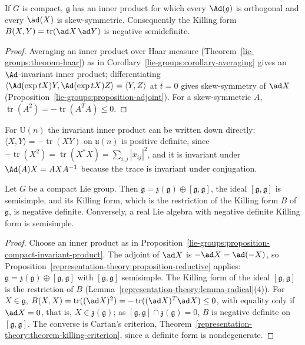 \begin{proposition}\label{lie-groups:proposition-compact-invariant-product}
If $G$ is compact, $\mathfrak{g}$ has an inner product for which every $\Ad(g)$ is orthogonal and every $\ad(X)$ is skew-symmetric. Consequently the Killing form $B(X, Y) = \operatorname{tr}(\ad X\,\ad Y)$ is negative semidefinite.
\end{proposition}

\begin{proof}
Averaging an inner product over Haar measure (Theorem~\ref{lie-groups:theorem-haar}) as in Corollary~\ref{lie-groups:corollary-averaging} gives an $\Ad$-invariant inner product; differentiating
$\langle\Ad(\exp tX)Y, \Ad(\exp tX)Z\rangle = \langle Y, Z\rangle$ at $t = 0$ gives skew-symmetry of $\ad X$ (Proposition~\ref{lie-groups:proposition-adjoint}). For a skew-symmetric $A$, $\operatorname{tr}(A^2) = -\operatorname{tr}(A^TA) \leq 0$.
\end{proof}

For $\mathrm{U}(n)$ the invariant inner product can be written down directly: $\langle X, Y\rangle = -\operatorname{tr}(XY)$ on $\mathfrak{u}(n)$ is positive
definite, since $-\operatorname{tr}(X^2) = \operatorname{tr}(X^*X) = \sum_{i,j}|x_{ij}|^2$, and it is invariant under $\Ad(A)X = AXA^{-1}$ because the trace is
invariant under conjugation.


\begin{proposition}\label{lie-groups:proposition-compact-reductive}
Let $G$ be a compact Lie group. Then $\mathfrak{g} = \mathfrak{z}(\mathfrak{g}) \oplus [\mathfrak{g}, \mathfrak{g}]$, the ideal $[\mathfrak{g}, \mathfrak{g}]$ is semisimple, and its Killing form,
which is the restriction of the Killing form $B$ of $\mathfrak{g}$, is negative definite. Conversely, a real Lie algebra with negative definite Killing form is semisimple.
\end{proposition}

\begin{proof}
Choose an inner product as in Proposition~\ref{lie-groups:proposition-compact-invariant-product}. The adjoint of $\ad X$ is $-\ad X = \ad(-X)$, so
Proposition~\ref{representation-theory:proposition-reductive} applies: $\mathfrak{g} = \mathfrak{z}(\mathfrak{g}) \oplus [\mathfrak{g}, \mathfrak{g}]$ with $[\mathfrak{g}, \mathfrak{g}]$
semisimple. The Killing form of the ideal $[\mathfrak{g}, \mathfrak{g}]$ is the restriction of $B$ (Lemma~\ref{representation-theory:lemma-radical}(4)). For $X \in \mathfrak{g}$,
$B(X, X) = \operatorname{tr}((\ad X)^2) = -\operatorname{tr}((\ad X)^T\ad X) \leq 0$, with equality only if $\ad X = 0$, that is, $X \in \mathfrak{z}(\mathfrak{g})$; as
$[\mathfrak{g}, \mathfrak{g}] \cap \mathfrak{z}(\mathfrak{g}) = 0$, $B$ is negative definite on $[\mathfrak{g}, \mathfrak{g}]$. The converse is Cartan's criterion,
Theorem~\ref{representation-theory:theorem-killing-criterion}, since a definite form is nondegenerate.
\end{proof}

